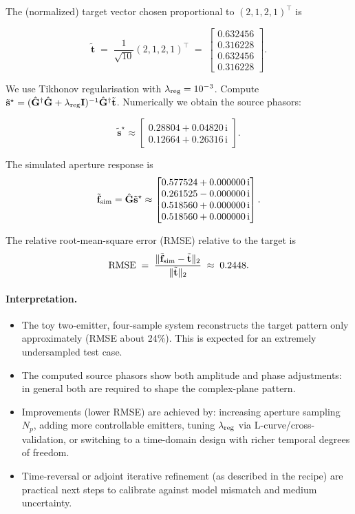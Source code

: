 \documentclass[11pt]{article}
\theoremstyle{plain}
\theoremstyle{definition}
\theoremstyle{remark}
\begin{document}
The (normalized) target vector chosen proportional to \((2,1,2,1)^\top\) is

\[
\tilde{\mathbf{t}} \;=\; \frac{1}{\sqrt{10}}(2,1,2,1)^\top
\;=\;
\begin{bmatrix}0.632456\\[2pt] 0.316228\\[2pt] 0.632456\\[2pt] 0.316228\end{bmatrix}.
\]

We use Tikhonov regularisation with \(\lambda_{\rm reg}=10^{-3}\).
Compute \(\tilde{\mathbf{s}}^\star = (\hat{\mathbf{G}}^\dagger\hat{\mathbf{G}}+\lambda_{\rm reg}\mathbf{I})^{-1}\hat{\mathbf{G}}^\dagger\tilde{\mathbf{t}}\).
Numerically we obtain the source phasors:

\[
\tilde{\mathbf{s}}^\star \approx
\begin{bmatrix}
0.28804 + 0.04820\,\mathrm{i} \\
0.12664 + 0.26316\,\mathrm{i}
\end{bmatrix}.
\]

The simulated aperture response is
\[
\tilde{\mathbf{f}}_{\rm sim} = \hat{\mathbf{G}}\tilde{\mathbf{s}}^\star
\approx
\begin{bmatrix}
0.577524 + 0.000000\,\mathrm{i} \\
0.261525 - 0.000000\,\mathrm{i} \\
0.518560 + 0.000000\,\mathrm{i} \\
0.518560 + 0.000000\,\mathrm{i}
\end{bmatrix}.
\]

The relative root-mean-square error (RMSE) relative to the target is
\[
\mathrm{RMSE} \;=\; \frac{\|\tilde{\mathbf{f}}_{\rm sim} - \tilde{\mathbf{t}}\|_2}{\|\tilde{\mathbf{t}}\|_2}
\;\approx\; 0.2448.
\]

\paragraph{Interpretation.}
\begin{itemize}[leftmargin=*,itemsep=4pt]
  \item The toy two-emitter, four-sample system reconstructs the target pattern only approximately (RMSE about 24\%). This is expected for an extremely undersampled test case.
  \item The computed source phasors show both amplitude and phase adjustments: in general both are required to shape the complex-plane pattern.
  \item Improvements (lower RMSE) are achieved by: increasing aperture sampling \(N_p\), adding more controllable emitters, tuning \(\lambda_{\rm reg}\) via L-curve/cross-validation, or switching to a time-domain design with richer temporal degrees of freedom.
  \item Time-reversal or adjoint iterative refinement (as described in the recipe) are practical next steps to calibrate against model mismatch and medium uncertainty.
\end{itemize}
\end{document}
